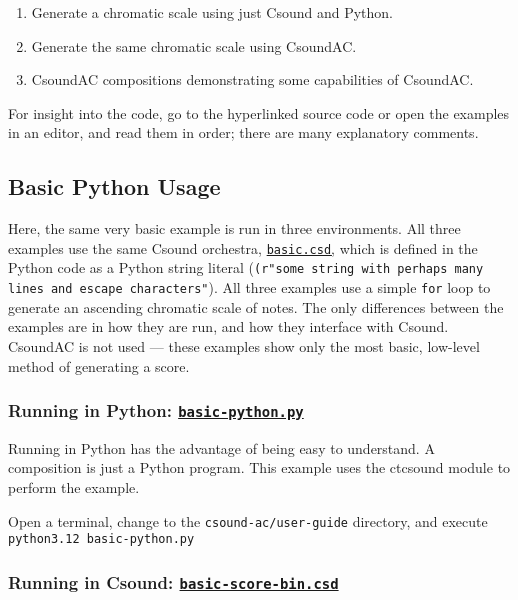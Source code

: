 \documentclass[letterpaper,10pt,DIV=12,parskip=half]{scrartcl}
\begin{document}
\begin{enumerate}
\item Generate a chromatic scale using just Csound and Python.
\item Generate the same chromatic scale using CsoundAC.
\item CsoundAC compositions demonstrating some capabilities of CsoundAC.
\end{enumerate}

For insight into the code, go to the hyperlinked source code or open the examples in an editor, and read them in order; there are many explanatory comments.

\subsection{Basic Python Usage}

Here, the same very basic example is run in three environments. All three examples use the same Csound orchestra, \href{https://github.com/gogins/csound-ac/blob/master/user-guide/basic.csd}{\lstinline|basic.csd|,} which is defined in the Python code as a Python string literal (\lstinline|(r"some string with perhaps many lines and escape characters"|). All three examples use a simple \lstinline|for| loop to generate an ascending chromatic scale of notes. The only differences between the examples are in how they are run, and how they interface with Csound. CsoundAC is not used --- these examples show only the most basic, low-level method of generating a score.

\subsubsection{Running in Python: \href{https://github.com/gogins/csound-ac/blob/master/user-guide/basic-python.py}{\lstinline{basic-python.py}}}

Running in Python has the advantage of being easy to understand. A composition is just a Python program. This example uses the ctcsound module to perform the example.

Open a terminal, change to the \lstinline|csound-ac/user-guide| directory, and execute \lstinline|python3.12 basic-python.py|

\subsubsection{Running in Csound: \href{https://github.com/gogins/csound-ac/blob/master/user-guide/basic-score-bin.csd}{\lstinline|basic-score-bin.csd|}}
\end{document}
